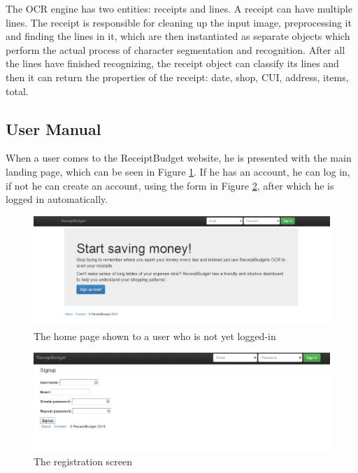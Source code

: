 The OCR engine has two entities: receipts and lines. A receipt can have multiple lines. The receipt is responsible for cleaning up the input image, preprocessing it and finding the lines in it, which are then instantiated as separate objects which perform the actual process of character segmentation and recognition. After all the lines have finished recognizing, the receipt object can classify its lines and then it can return the properties of the receipt: date, shop, CUI, address, items, total. 


\subsection{User Manual}
\label{sec:manual}

When a user comes to the ReceiptBudget website, he is presented with the main landing page, which can be seen in Figure \ref{fig:intro}. If he has an account, he can log in, if not he can create an account, using the form in Figure \ref{fig:register}, after which he is logged in automatically.

\begin{figure}[htdp]
\begin{center}
\includegraphics[width=\linewidth]{img/manual/intro.png}
\caption{\label{fig:intro}
The home page shown to a user who is not yet logged-in}
\end{center}
\end{figure}

\begin{figure}[htdp]
\begin{center}
\includegraphics[width=\linewidth]{img/manual/register.png}
\caption{\label{fig:register}
The registration screen}
\end{center}
\end{figure}

